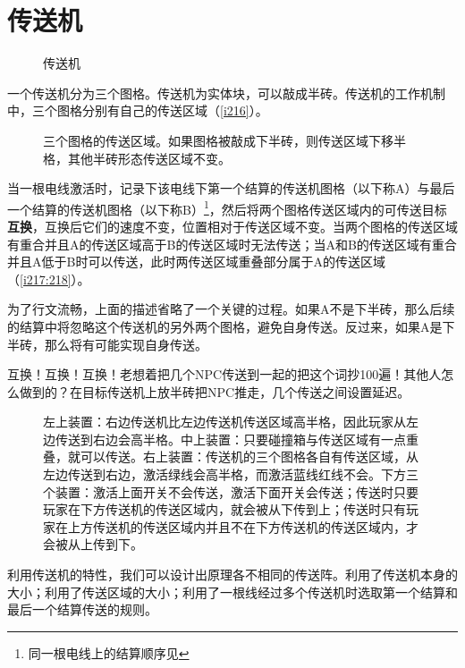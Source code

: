 \section{传送机}\label{chuansongji}
\begin{figure}[!ht]
  \centering
  \caption{传送机}
\end{figure}
一个传送机分为三个图格。传送机为实体块，可以敲成半砖。传送机的工作机制中，三个图格分别有自己的传送区域（\autoref{i216}）。

\begin{figure}[!ht]
  \centering
  \caption{三个图格的传送区域。如果图格被敲成下半砖，则传送区域下移半格，其他半砖形态传送区域不变。}
  \label{i216}
\end{figure}

当一根电线激活时，记录下该电线下第一个结算的传送机图格（以下称A）与最后一个结算的传送机图格（以下称B）\footnote{同一根电线上的结算顺序见}，然后将两个图格传送区域内的可传送目标\textbf{互换}，互换后它们的速度不变，位置相对于传送区域不变。当两个图格的传送区域有重合并且A的传送区域高于B的传送区域时无法传送；当A和B的传送区域有重合并且A低于B时可以传送，此时两传送区域重叠部分属于A的传送区域（\autoref{i217:218}）。

为了行文流畅，上面的描述省略了一个关键的过程。如果A不是下半砖，那么后续的结算中将忽略这个传送机的另外两个图格，避免自身传送。反过来，如果A是下半砖，那么将有可能实现自身传送。

\begin{remark*}{}{}
  互换！{\LARGE 互换！}{\huge 互换！}老想着把几个NPC传送到一起的把这个词抄100遍！其他人怎么做到的？在目标传送机上放半砖把NPC推走，几个传送之间设置延迟。
\end{remark*}

\begin{figure}[!ht]
  \centering
  \caption{左上装置：右边传送机比左边传送机传送区域高半格，因此玩家从左边传送到右边会高半格。中上装置：只要碰撞箱与传送区域有一点重叠，就可以传送。右上装置：传送机的三个图格各自有传送区域，从左边传送到右边，激活绿线会高半格，而激活蓝线红线不会。下方三个装置：激活上面开关不会传送，激活下面开关会传送；传送时只要玩家在下方传送机的传送区域内，就会被从下传到上；传送时只有玩家在上方传送机的传送区域内并且不在下方传送机的传送区域内，才会被从上传到下。}
  \label{i217:218}
\end{figure}

利用传送机的特性，我们可以设计出原理各不相同的传送阵。利用了传送机本身的大小；利用了传送区域的大小；利用了一根线经过多个传送机时选取第一个结算和最后一个结算传送的规则。

